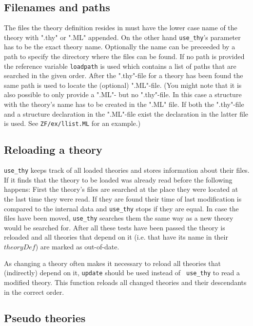\subsection{Filenames and paths}

The files the theory definition resides in must have the lower case name of
the theory with ".thy" or ".ML" appended.  On the other hand {\tt use_thy}'s
parameter has to be the exact theory name.  Optionally the name can be
preceeded by a path to specify the directory where the files can be found.  If
no path is provided the reference variable {\tt loadpath} is used which
contains a list of paths that are searched in the given order.  After the
".thy"-file for a theory has been found the same path is used to locate the
(optional) ".ML"-file.  (You might note that it is also possible to only
provide a ".ML"- but no ".thy"-file.  In this case a \ML{} structure with the
theory's name has to be created in the ".ML" file.  If both the ".thy"-file
and a structure declaration in the ".ML"-file exist the declaration in the
latter file is used.  See {\tt ZF/ex/llist.ML} for an example.)


\subsection{Reloading a theory}

{\tt use_thy} keeps track of all loaded theories and stores information about
their files.  If it finds that the theory to be loaded was already read before
the following happens:  First the theory's files are searched at the place
they were located at the last time they were read. If they are found their
time of last modification is compared to the internal data and {\tt use_thy}
stops if they are equal. In case the files have been moved, {\tt use_thy}
searches them the same way as a new theory would be searched for.  After all
these tests have been passed the theory is reloaded and all theories that
depend on it (i.e. that have its name in their $theoryDef$) are marked as
out-of-date.

As changing a theory often makes it necessary to reload all theories that
(indirectly) depend on it, {\tt update} should be used instead of {\tt
use_thy} to read a modified theory.  This function reloads all changed
theories and their descendants in the correct order.


\subsection{Pseudo theories}

